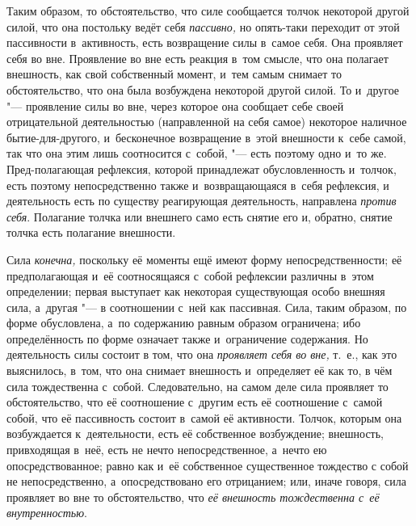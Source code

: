 Таким образом, то обстоятельство, что силе сообщается толчок некоторой
другой силой, что она постольку ведёт себя
{\em пассивно,} но опять-таки переходит от этой
пассивности в~активность, есть возвращение силы в~самое себя. Она проявляет
себя во вне. Проявление во вне есть реакция в~том смысле, что она полагает
внешность, как свой собственный момент, и~тем самым снимает то
обстоятельство, что она была возбуждена некоторой другой силой. То и~другое
"--- проявление силы во вне, через которое она сообщает себе своей
отрицательной деятельностью (направленной на себя самое) некоторое наличное
бытие-для-другого, и~бесконечное возвращение в~этой внешности к~себе самой,
так что она этим лишь соотносится с~собой, "--- есть поэтому одно и~то же.
Пред-полагающая рефлексия, которой принадлежат обусловленность и~толчок,
есть поэтому непосредственно также и~возвращающаяся в~себя рефлексия, и
деятельность есть по существу реагирующая деятельность, направлена
{\em против себя}. Полагание толчка или внешнего само
есть снятие его и, обратно, снятие толчка есть полагание внешности.



Сила {\em конечна,}
поскольку её моменты ещё имеют форму непосредственности; её предполагающая
и~её соотносящаяся с~собой рефлексии различны в~этом определении; первая
выступает как некоторая существующая особо внешняя сила, а~другая "--- в
соотношении с~ней как пассивная. Сила, таким образом, по форме обусловлена,
а~по содержанию равным образом ограничена; ибо определённость по форме
означает также и~ограничение содержания. Но деятельность силы состоит в
том, что она {\em проявляет себя во вне,} т.~е., как
это выяснилось, в~том, что она снимает внешность и~определяет её как то, в
чём сила тождественна с~собой. Следовательно, на самом деле сила проявляет
то обстоятельство, что её соотношение с~другим есть её соотношение с~самой
собой, что её пассивность состоит в~самой её активности. Толчок, которым
она возбуждается к~деятельности, есть её собственное возбуждение;
внешность, привходящая в~неё, есть не нечто непосредственное, а~нечто ею
опосредствованное; равно как и~её собственное существенное тождество с
собой не непосредственно, а~опосредствовано его отрицанием; или, иначе
говоря, сила проявляет во вне то обстоятельство, что
{\em её внешность тождественна с~её внутренностью}.


